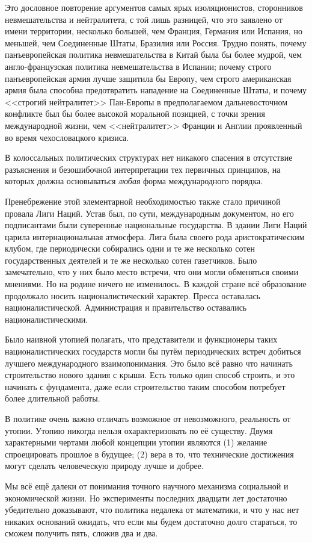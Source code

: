 Это дословное повторение аргументов самых ярых изоляционистов, сторонников невмешательства и нейтралитета, с той лишь разницей, что это заявлено от имени территории, несколько большей, чем Франция, Германия или Испания, но меньшей, чем Соединенные Штаты, Бразилия или Россия. Трудно понять, почему панъевропейская политика невмешательства в Китай была бы более мудрой, чем англо-французская политика невмешательства в Испании; почему строго панъевропейская армия лучше защитила бы Европу, чем строго американская армия была способна предотвратить нападение на Соединенные Штаты, и почему <<строгий нейтралитет>> Пан-Европы в предполагаемом дальневосточном конфликте был бы более высокой моральной позицией, с точки зрения международной жизни, чем <<нейтралитет>> Франции и Англии проявленный во время чехословацкого кризиса.

В колоссальных политических структурах нет никакого спасения в отсутствие разъяснения и безошибочной интерпретации тех первичных принципов, на которых должна основываться \textit{любая} форма международного порядка.

Пренебрежение этой элементарной необходимостью также стало причиной провала Лиги Наций. Устав был, по сути, международным документом, но его подписантами были суверенные национальные государства. В здании Лиги Наций царила интернациональная атмосфера. Лига была своего рода аристократическим клубом, где периодически собирались одни и те же несколько сотен государственных деятелей и те же несколько сотен газетчиков. Было замечательно, что у них было место встречи, что они могли обменяться своими мнениями. Но на родине ничего не изменилось. В каждой стране всё образование продолжало носить националистический характер. Пресса оставалась националистической. Администрация и правительство оставались националистическими.

Было наивной утопией полагать, что представители и функционеры таких националистических государств могли бы путём периодических встреч добиться лучшего международного взаимопонимания. Это было всё равно что начинать строительство нового здания с крыши. Есть только один способ строить, и это начинать с фундамента, даже если строительство таким способом потребует более длительной работы.

В политике очень важно отличать возможное от невозможного, реальность от утопии. Утопию никогда нельзя охарактеризовать по её существу. Двумя характерными чертами любой концепции утопии являются (1) желание спроецировать прошлое в будущее; (2) вера в то, что технические достижения могут сделать человеческую природу лучше и добрее.

Мы всё ещё далеки от понимания точного научного механизма социальной и экономической жизни. Но эксперименты последних двадцати лет достаточно убедительно доказывают, что политика недалека от математики, и что у нас нет никаких оснований ожидать, что если мы будем достаточно долго стараться, то сможем получить пять, сложив два и два.
